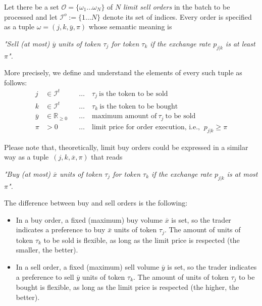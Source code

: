 \documentclass[11pt,parskip=full]{scrartcl}%
\newcommand*{\ie}{i.e., }
\newcommand*{\orders}{\mathcal{O}}          %
\newcommand*{\itokens}{\mathcal{I}^t}       %
\newcommand*{\iorders}{\mathcal{I}^o}       %
\begin{document}
Let there be a set $ \orders = \{ \omega_1 \ldots \omega_N \} $ of $ N $ \emph{limit sell orders}
in the batch to be processed and let $ \iorders := \{ 1 \ldots N \} $ denote its set of indices.
Every order is specified as a tuple $ \omega = (j,k,\overline{y},\pi) $ whose semantic meaning is
\vspace{-.6cm}
\begin{center}
  \emph{
    "Sell (at most) $ \overline{y} $ units of token $ \tau_j $ for token $ \tau_k $
    if the exchange rate $ p_{j|k} $ is at least $ \pi $".
  }
\end{center}
\vspace{-.5cm}
More precisely, we define and understand the elements of every such tuple as follows:
\begin{align*}
  j &\in \itokens &&
    \ldots \quad \tau_j \> \text{is the token to be sold}\\
  k &\in \itokens &&
    \ldots \quad \tau_k \> \text{is the token to be bought}\\
  \overline{y} &\in \mathbb{R}_{\ge 0} &&
    \ldots \quad \text{maximum amount of} \> \tau_j \> \text{to be sold}\\
  \pi &> 0 &&
    \ldots \quad \text{limit price for order execution, \ie} \> p_{j|k} \ge \pi
\end{align*}

Please note that, theoretically, limit buy orders could be expressed in a similar way as
a tuple~$ (j,k,\overline{x},\pi) $ that reads
\vspace{-.6cm}
\begin{center}
  \emph{
    "Buy (at most) $ \overline{x} $ units of token $ \tau_j $ for token $ \tau_k $
    if the exchange rate $ p_{j|k} $ is at most $ \pi $".
  }
\end{center}
\vspace{-.5cm}
The difference between buy and sell orders is the following:
\begin{itemize}
  \item In a buy order, a fixed (maximum) buy volume $ \overline{x} $ is set, so the trader
  indicates a preference to buy $ \overline{x} $ units of token $ \tau_j $.
  The amount of units of token $ \tau_k $ to be sold is flexible, as long as the limit price is
  respected (the smaller, the better).
  \item In a sell order, a fixed (maximum) sell volume $ \overline{y} $ is set, so the trader
  indicates a preference to sell $ \overline{y} $ units of token $ \tau_k $.
  The amount of units of token $ \tau_j $ to be bought is flexible, as long as the limit price
  is respected (the higher, the better).
\end{itemize}
\vspace{.3cm}
\end{document}
